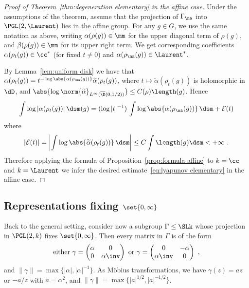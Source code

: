 \begin{proof}[Proof of Theorem~\ref{thm:degeneration elementary} in the affine case]
Under the assumptions of the theorem, assume that the projection of $\Gamma_\na$ into $\PGL(2,\Laurent)$ lies in the affine group. For any $g\in G$, we use the same notation as above, writing $\alpha(\rho(g))\in \mm$ for the upper diagonal term of $\rho(g)$, and $\beta(\rho(g))\in \mm$ for its upper right term. We get corresponding coefficients $\alpha(\rho_t(g))\in \cc^*$ (for fixed $t\neq 0$) and $\alpha(\rho_\na(g))\in \Laurent^*$.


By Lemma~\ref{lem:uniform disk} we have that $\alpha(\rho_t(g)) = t^{-\log \abs{\alpha(\rho_\na(g))}} \widetilde\alpha(\rho_t(g))$, where $ t\mapsto \widetilde\alpha(\rho_t(g))$ is holomorphic in $\dD$, and $\abs{\log\norm{\widetilde \alpha }_{L^\infty(\overline{\D}(0, 1/2))} }\leq C(\rho) \length(g)$. Hence
\begin{equation}\label{eq:affine error}
\int \log|\alpha(\rho_t(g))| \, \dsm(g) = (\log|t|^{-1}) \, \int \log \abs{\alpha(\rho_\na(g))} \, \dsm + \mathcal{E}(t)
\end{equation}
where
\begin{equation}\label{eq:affine error2}
|\mathcal{E}(t)| = \left| \int \log \abs{\widetilde\alpha(\rho_t(g))} \, \dsm \right|
\le C \int \length(g) \dsm <+\infty~.
\end{equation}
Therefore applying the formula of Proposition~\ref{prop:formula affine} to $k = \cc$ and $k= \Laurent$ we infer the desired estimate~\eqref{eq:lyapunov elementary} in the affine case.
\end{proof}


\subsection{Representations fixing \texorpdfstring{$\set{0, \infty}$}{set0, infty}}

Back to the general setting, consider now a subgroup $\Gamma\leq \SLk$ whose projection in $\PGL(2,k)$ fixes $\set{0, \infty}$. Then every matrix in $\Gamma$ is of the form
\[
\text{either }\gamma =
\begin{pmatrix} \alpha & 0 \\ 0 &\alpha\inv
\end{pmatrix} \text{ or }
\gamma =
\begin{pmatrix} 0 & -\alpha \\ \alpha \inv &0
\end{pmatrix}~,
\]
and $\| \gamma \| = \max \{|\alpha|, |\alpha|^{-1}\}$. As M\"obius transformations, we have $\gamma(z) = a z$ or $-a/z$ with $a = \alpha^2$, and $\| \gamma\| = \max \{|a|^{1/2}, |a|^{-1/2}\}$.

